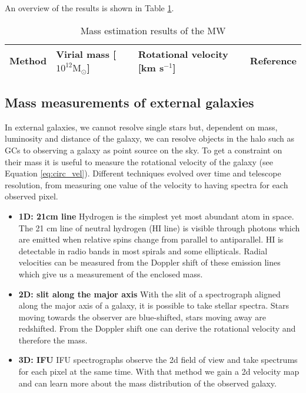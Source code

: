 An overview of the results is shown in Table \ref{tab:MW_mass_estimations}.
\begin{table}[htbp]
\captionsetup{format=plain}
    \centering
    \begin{tabular}{@{}llll@{}}
         \toprule
         Method& Virial mass [$10^{12} \mathrm{M}_\odot$] & Rotational velocity [km s$^{-1}$]&Reference  \\
         
         \midrule

         \bottomrule 
    \end{tabular}
    \caption{Mass estimation results of the \ac{MW} }
    \label{tab:MW_mass_estimations}
\end{table}


\subsection{Mass measurements of external galaxies}\label{subsec:mass_est_ext}
In external galaxies, we cannot resolve single stars but, dependent on mass, luminosity and distance of the galaxy, we can resolve objects in the halo such as \acp{GC} to observing a galaxy as point source on the sky. To get a constraint on their mass it is useful to measure the rotational velocity of the galaxy (see Equation \ref{eq:circ_vel}). Different techniques evolved over time and telescope resolution, from measuring one value of the velocity to having spectra for each observed pixel.
\begin{itemize}
    \item\textbf{1D: 21cm line} Hydrogen is the simplest yet most abundant atom in space. The 21 cm line of neutral hydrogen (HI line) is visible through photons which are emitted when relative spins change from parallel to antiparallel. HI is detectable in radio bands in most spirals and some ellipticals. Radial velocities can be measured from the Doppler shift of these emission lines which give us a measurement of the enclosed mass.
    \item\textbf{2D: slit along the major axis} With the slit of a spectrograph aligned along the major axis of a galaxy, it is possible to take stellar spectra. Stars moving towards the observer are blue-shifted, stars moving away are redshifted. From the Doppler shift one can derive the rotational velocity and therefore the mass.
    \item \textbf{3D: \ac{IFU}} \ac{IFU} spectrographs observe the 2d field of view and take spectrums for each pixel at the same time. With that method we gain a 2d velocity map and can learn more about the mass distribution of the observed galaxy.
\end{itemize}

